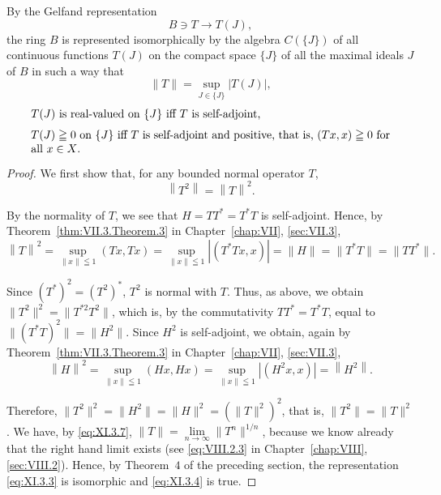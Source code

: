 \begin{theorem}\label{thm:XI.3.Theorem.1} By the Gelfand representation 
\begin{equation}\label{eq:XI.3.3}
B \ni T \rightarrow T (J),
\end{equation}
the ring $B$ is represented isomorphically by the algebra $C(\{J\})$ of all continuous functions $T(J)$ on the compact space $\{J\}$ of all the maximal 
ideals $J$ of $B$ in such a way that 
\begin{equation}\label{eq:XI.3.4}
\|T\|=\sup_{J\in\{J\}}|T(J)|,
\end{equation}
\begin{equation}\label{eq:XI.3.5}
\begin{minipage}{0.92\linewidth}
\everymath{}\let\limits\nolimits
$T(J)$ is real-valued on $\{J\}$ iff $T$ is self-adjoint,
\end{minipage}
\end{equation}
\begin{equation}\label{eq:XI.3.6}
\begin{minipage}{0.92\linewidth}
\everymath{}\let\limits\nolimits
$T(J)\geqq0$ on $\{J\}$ iff $T$ is self-adjoint and positive, that is, $(Tx,x)\geqq0$ for all $x\in X$.
\end{minipage}
\end{equation}

\end{theorem}

\begin{proof}
 We first show that, for any bounded normal operator $T$, 
\begin{equation}\label{eq:XI.3.7}
\left\| T ^{2} \right\| = \left\| T \right\| ^{2}. \end{equation}

By the normality of $T$, we see that $H = TT^{*} = T^{*}T$ is self-adjoint. Hence, by Theorem~\ref{thm:VII.3.Theorem.3} in Chapter~\ref{chap:VII}, \ref{sec:VII.3}, 
\[
\left\| T \right\| ^{2} = \sup\limits _{\| x \| \leqq 1} (T x, T x) = \sup\limits _{\| x \| \leqq 1} \left| \left(T ^{*} T x, x\right) \right| = \| H \| = \| T ^{*} T \| = \| T T ^{*} \|.
\]

Since $(T^{*})^{2} = (T^{2})^{*}$, $T^{2}$ is normal with $T$. Thus, as above, we obtain $\| T^2\|^2 = \| T^{*2}T^2\|$, which is, by the commutativity $TT^{*} = T^{*}T$, equal to $\| (T^{*}T)^{2}\| = \| H^{2}\|$. Since $H^{2}$ is self-adjoint, we obtain, again by Theorem~\ref{thm:VII.3.Theorem.3} in Chapter~\ref{chap:VII}, \ref{sec:VII.3}, 
\[
\left\| H \right\| ^{2} = \sup\limits _{\| x \| \leqq 1} (H x, H x) = \sup\limits _{\| x \| \leqq 1} \left| \left(H ^{2} x, x\right) \right| = \left\| H ^{2} \right\|.
\]

Therefore, $\|T^2\|^2 = \|H^2\| = \|H\|^2 = (\|T\|^2)^2$, that is, $\|T^2\| = \|T\|^2$. We have, by \eqref{eq:XI.3.7}, $\|T\| = \lim\limits_{n\to \infty} \|T^n\|^{1/n}$, because we know already that the right hand limit exists (see \eqref{eq:VIII.2.3} in Chapter~\ref{chap:VIII}, \ref{sec:VIII.2}). Hence, by Theorem~\hyperref[thm:XI.2.Theorem.4]{$4$} of the preceding section, the representation \eqref{eq:XI.3.3} is isomorphic and \eqref{eq:XI.3.4} is true. 
\end{proof}

